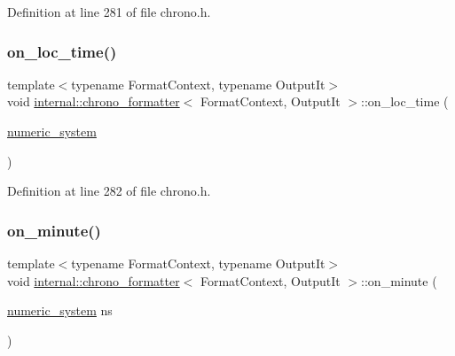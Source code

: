 Definition at line 281 of file chrono.\+h.

\mbox{\label{structinternal_1_1chrono__formatter_a1228ee5fbece50b8b0cc103b2c8af230}} 
\subsubsection{\texorpdfstring{on\+\_\+loc\+\_\+time()}{on\_loc\_time()}}
{\footnotesize\ttfamily template$<$typename Format\+Context, typename Output\+It$>$ \\
void \hyperlink{structinternal_1_1chrono__formatter}{internal\+::chrono\+\_\+formatter}$<$ Format\+Context, Output\+It $>$\+::on\+\_\+loc\+\_\+time (\begin{DoxyParamCaption}\item[{\hyperlink{namespaceinternal_a16e2a1195ca0f5beab658685f71df86b}{numeric\+\_\+system}}]{ }\end{DoxyParamCaption})\hspace{0.3cm}{\ttfamily [inline]}}



Definition at line 282 of file chrono.\+h.

\mbox{\label{structinternal_1_1chrono__formatter_a3c876205400e32b34a88986f47b0775d}} 
\subsubsection{\texorpdfstring{on\+\_\+minute()}{on\_minute()}}
{\footnotesize\ttfamily template$<$typename Format\+Context, typename Output\+It$>$ \\
void \hyperlink{structinternal_1_1chrono__formatter}{internal\+::chrono\+\_\+formatter}$<$ Format\+Context, Output\+It $>$\+::on\+\_\+minute (\begin{DoxyParamCaption}\item[{\hyperlink{namespaceinternal_a16e2a1195ca0f5beab658685f71df86b}{numeric\+\_\+system}}]{ns }\end{DoxyParamCaption})\hspace{0.3cm}{\ttfamily [inline]}}



